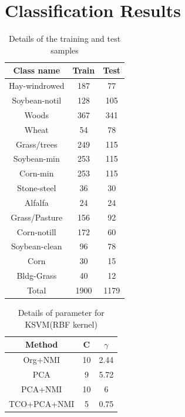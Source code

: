 \documentclass[document.tex]{subfiles}
\begin{document}
\section{Classification Results}
\begin{table}[H]
	\caption{Details of the training and test samples}
	\begin{center}
		\begin{tabular}{|c|c|c|}
			\hline
			Class name & Train & Test\\ \hline
			Hay-windrowed & 187 & 77\\ \hline
			Soybean-notil & 128 & 105\\ \hline
			Woods & 367 & 341\\ \hline
			Wheat & 54 & 78\\ \hline
			Grass/trees & 249 & 115\\ \hline
			Soybean-min & 253 & 115\\ \hline
			Corn-min & 253 & 115\\ \hline
			Stone-steel & 36 & 30\\ \hline
			Alfalfa & 24 & 24\\ \hline
			Grass/Pasture & 156 & 92\\ \hline
			Corn-notill & 172 & 60\\ \hline
			Soybean-clean & 96 & 78\\ \hline
			Corn & 30 & 15\\ \hline
			Bldg-Grass & 40 & 12\\ \hline
			Total & 1900 & 1179\\ \hline
		\end{tabular}
	\end{center}
	\label{tab:Details of the training and test samples}
\end{table}

\begin{table}[H]
	\caption{Details of parameter for KSVM(RBF kernel)}
	\begin{center}
		\begin{tabular}{|c|c|c|}
			\hline
			Method & C & $\gamma$ \\ \hline
			Org+NMI & 10 & 2.44 \\ \hline
			PCA & 9 & 5.72 \\ \hline
			PCA+NMI & 10 & 6\\ \hline
			TCO+PCA+NMI & 5 & 0.75\\ \hline
		\end{tabular}
	\end{center}
	\label{tab:Details of parameter for KSVM(RBF kernel)}
\end{table}
\end{document}
